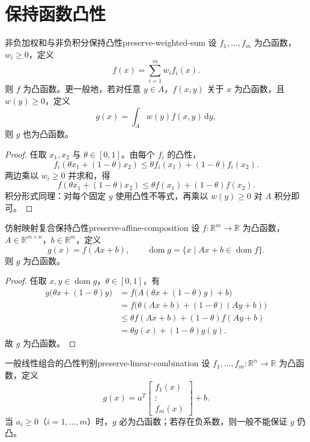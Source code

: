 \documentclass[11pt,a4paper]{article}
\begin{document}
\section{保持函数凸性}\label{sec:ch3-preserve-convexity}

\begin{example}{非负加权和与非负积分保持凸性}{preserve-weighted-sum}
设 $f_1,\dots,f_m$ 为凸函数，$w_i\ge 0$，定义
\[
f(x)=\sum_{i=1}^m w_i f_i(x).
\]
则 $f$ 为凸函数。更一般地，若对任意 $y\in A$，$f(x,y)$ 关于 $x$ 为凸函数，且 $w(y)\ge 0$，定义
\[
g(x)=\int_A w(y)f(x,y)\,\mathrm{d}y,
\]
则 $g$ 也为凸函数。
\end{example}

\begin{proof}
任取 $x_1,x_2$ 与 $\theta\in[0,1]$。由每个 $f_i$ 的凸性，
\[
f_i(\theta x_1+(1-\theta)x_2)\le \theta f_i(x_1)+(1-\theta)f_i(x_2).
\]
两边乘以 $w_i\ge 0$ 并求和，得
\[
f(\theta x_1+(1-\theta)x_2)\le \theta f(x_1)+(1-\theta)f(x_2).
\]
积分形式同理：对每个固定 $y$ 使用凸性不等式，再乘以 $w(y)\ge0$ 对 $A$ 积分即可。
\end{proof}

\begin{theorem}{仿射映射复合保持凸性}{preserve-affine-composition}
设 $f:\mathbb{R}^m\to\mathbb{R}$ 为凸函数，$A\in\mathbb{R}^{m\times n}$，$b\in\mathbb{R}^m$，定义
\[
g(x)=f(Ax+b),\qquad
\operatorname{dom}g=\{x\mid Ax+b\in\operatorname{dom}f\}.
\]
则 $g$ 为凸函数。
\end{theorem}

\begin{proof}
任取 $x,y\in\operatorname{dom}g$，$\theta\in[0,1]$，有
\[
\begin{aligned}
g\bigl(\theta x+(1-\theta)y\bigr)
&=f\bigl(A(\theta x+(1-\theta)y)+b\bigr) \\
&=f\bigl(\theta(Ax+b)+(1-\theta)(Ay+b)\bigr) \\
&\le \theta f(Ax+b)+(1-\theta)f(Ay+b) \\
&=\theta g(x)+(1-\theta)g(y).
\end{aligned}
\]
故 $g$ 为凸函数。
\end{proof}

\begin{theorem}{一般线性组合的凸性判别}{preserve-linear-combination}
设 $f_1,\dots,f_m:\mathbb{R}^n\to\mathbb{R}$ 为凸函数，定义
\[
g(x)=a^T
\begin{bmatrix}
f_1(x)\\ \vdots\\ f_m(x)
\end{bmatrix}
+b.
\]
当 $a_i\ge 0$（$i=1,\dots,m$）时，$g$ 必为凸函数；若存在负系数，则一般不能保证 $g$ 仍凸。
\end{theorem}
\end{document}
